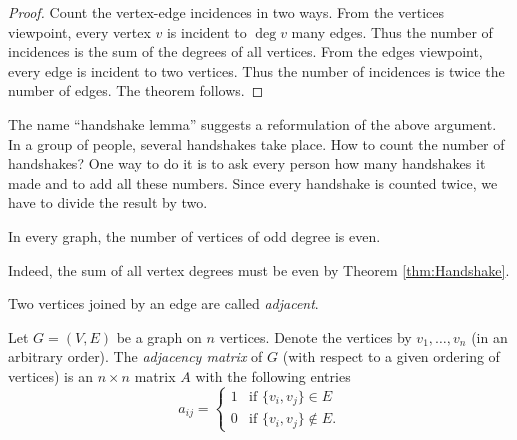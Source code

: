 \begin{page}
\setcounter{section}{1}
\setcounter{subsection}{4}
\setcounter{dfn}{10}
\label{portion:174}

\begin{proof}
Count the vertex-edge incidences in two ways.
From the vertices viewpoint, every vertex $v$ is incident to $\deg v$ many edges.
Thus the number of incidences is the sum of the degrees of all vertices.
From the edges viewpoint, every edge is incident to two vertices.
Thus the number of incidences is twice the number of edges.
The theorem follows.
\end{proof}
The name ``handshake lemma'' suggests a reformulation of the above argument.
In a group of people, several handshakes take place. How to count the number of handshakes?
One way to do it is to ask every person how many handshakes it made and to add all these numbers.
Since every handshake is counted twice, we have to divide the result by two.


\end{page}

\begin{page}
\setcounter{section}{1}
\setcounter{subsection}{4}
\setcounter{dfn}{11}
\label{portion:176}

\begin{cor}
In every graph, the number of vertices of odd degree is even.
\end{cor}

\end{page}

\begin{page}
\setcounter{section}{1}
\setcounter{subsection}{4}
\setcounter{dfn}{11}
\label{portion:177}

Indeed, the sum of all vertex degrees must be even by Theorem \ref{thm:Handshake}.

Two vertices joined by an edge are called \emph{adjacent}.


\end{page}

\begin{page}
\setcounter{section}{1}
\setcounter{subsection}{4}
\setcounter{dfn}{12}
\label{portion:179}

\begin{dfn}
Let $G = (V, E)$ be a graph on $n$ vertices.
Denote the vertices by $v_1, \ldots, v_n$ (in an arbitrary order).
The \emph{adjacency matrix} of $G$ (with respect to a given ordering of vertices) is an $n \times n$ matrix $A$ with the following entries
\[
a_{ij} =
\begin{cases}
1 &\text{if } \{v_i, v_j\} \in E\\
0 &\text{if } \{v_i, v_j\} \notin E.
\end{cases}
\]
\end{dfn}

\end{page}

